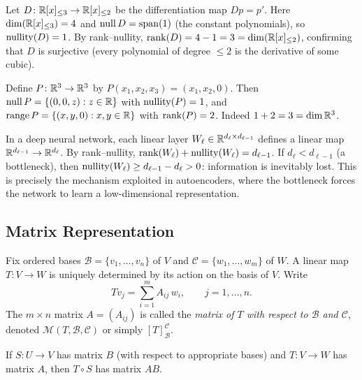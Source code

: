\documentclass[11pt,a4paper]{article}
\begin{document}
\begin{example}
\label{ex:rank_nullity_diff}
Let $D\colon \mathbb{R}[x]_{\leq 3} \to \mathbb{R}[x]_{\leq 2}$ be the differentiation map
$Dp = p'$.  Here $\dim(\mathbb{R}[x]_{\leq 3}) = 4$ and
$\operatorname{null} D = \operatorname{span}(1)$ (the constant polynomials), so
$\operatorname{nullity}(D) = 1$.  By rank--nullity, $\operatorname{rank}(D) = 4 - 1 = 3 = \dim(\mathbb{R}[x]_{\leq 2})$,
confirming that $D$ is surjective (every polynomial of degree $\leq 2$ is the
derivative of some cubic).
\end{example}

\begin{example}
\label{ex:projection}
Define $P\colon \mathbb{R}^3 \to \mathbb{R}^3$ by $P(x_1, x_2, x_3) = (x_1, x_2, 0)$.
Then $\operatorname{null} P = \{(0,0,z) : z \in \mathbb{R}\}$ with $\operatorname{nullity}(P) = 1$,
and $\operatorname{range} P = \{(x,y,0) : x,y \in \mathbb{R}\}$ with $\operatorname{rank}(P) = 2$.
Indeed $1 + 2 = 3 = \dim \mathbb{R}^3$.
\end{example}

\begin{rlconnection}[title={Rank Deficiency and Bottleneck Layers}]
In a deep neural network, each linear layer $W_\ell \in \mathbb{R}^{d_{\ell} \times d_{\ell-1}}$
defines a linear map $\mathbb{R}^{d_{\ell-1}} \to \mathbb{R}^{d_\ell}$.  By rank--nullity,
$\operatorname{rank}(W_\ell) + \operatorname{nullity}(W_\ell) = d_{\ell-1}$.  If $d_\ell < d_{\ell-1}$
(a bottleneck), then $\operatorname{nullity}(W_\ell) \geq d_{\ell-1} - d_\ell > 0$:
information is inevitably lost.  This is precisely the mechanism exploited
in autoencoders, where the bottleneck forces the network to learn a
low-dimensional representation.
\end{rlconnection}

\subsection{Matrix Representation}

Fix ordered bases $\mathcal{B} = \{v_1, \ldots, v_n\}$ of $V$ and
$\mathcal{C} = \{w_1, \ldots, w_m\}$ of $W$.  A linear map $T\colon V \to W$
is uniquely determined by its action on the basis of $V$.  Write
\[
  Tv_j = \sum_{i=1}^{m} A_{ij}\, w_i, \qquad j = 1, \ldots, n.
\]
The $m \times n$ matrix $A = (A_{ij})$ is called the \emph{matrix of $T$ with
respect to $\mathcal{B}$ and $\mathcal{C}$}, denoted
$\mathcal{M}(T, \mathcal{B}, \mathcal{C})$ or simply $[T]_{\mathcal{B}}^{\mathcal{C}}$.

\begin{proposition}
\label{prop:composition_matrix}
If $S\colon U \to V$ has matrix $B$ (with respect to appropriate bases) and
$T\colon V \to W$ has matrix $A$, then $T \circ S$ has matrix $AB$.
\end{proposition}
\end{document}
